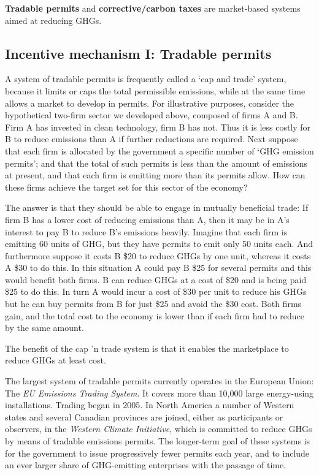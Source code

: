 \begin{DefBox}
\textbf{Tradable permits} and \textbf{corrective/carbon taxes} are market-based systems aimed at reducing GHGs.
\end{DefBox}

\newhtmlpage

\subsection*{Incentive mechanism I: Tradable permits}

A system of tradable permits is frequently called a `cap and trade' system,
because it limits or caps the total permissible emissions, while at the same
time allows a market to develop in permits. For illustrative purposes,
consider the hypothetical two-firm sector we developed above, composed of
firms A and B. Firm A has invested in clean technology, firm B has not. Thus
it is less costly for B to reduce emissions than A if further reductions are
required. Next suppose that each firm is allocated by the government a
specific number of `GHG emission permits'; and that the total of such
permits is less than the amount of emissions at present, and that each firm
is emitting more than its permits allow. How can these firms achieve the
target set for this sector of the economy?

The answer is that they should be able to engage in mutually beneficial
trade: If firm B has a lower cost of reducing emissions than A, then it may
be in A's interest to pay B to reduce B's emissions heavily. Imagine that
each firm is emitting 60 units of GHG, but they have permits to emit only 
50 units each. And furthermore suppose it costs B \$20 to reduce GHGs by
one unit, whereas it costs A \$30 to do this. In this situation A could
pay B \$25 for several permits and this would benefit both firms. B can
reduce GHGs at a cost of \$20 and is being paid \$25 to do this. In turn
A would incur a cost of \$30 per unit to reduce his GHGs but he can buy
permits from B for just \$25 and avoid the \$30 cost. Both firms gain,
and the total cost to the economy is lower than if each firm had to reduce
by the same amount.

The benefit of the cap 'n trade system is that it enables the marketplace to
reduce GHGs at least cost.

The largest system of tradable permits currently operates in the European
Union: The \textit{EU Emissions Trading System}. It covers more than 10,000
large energy-using installations. Trading began in 2005. In North America a
number of Western states and several Canadian provinces are joined, either
as participants or observers, in the \textit{Western Climate Initiative},
which is committed to reduce GHGs by means of tradable emissions permits.
The longer-term goal of these systems is for the government to issue
progressively fewer permits each year, and to include an ever larger share
of GHG-emitting enterprises with the passage of time.

